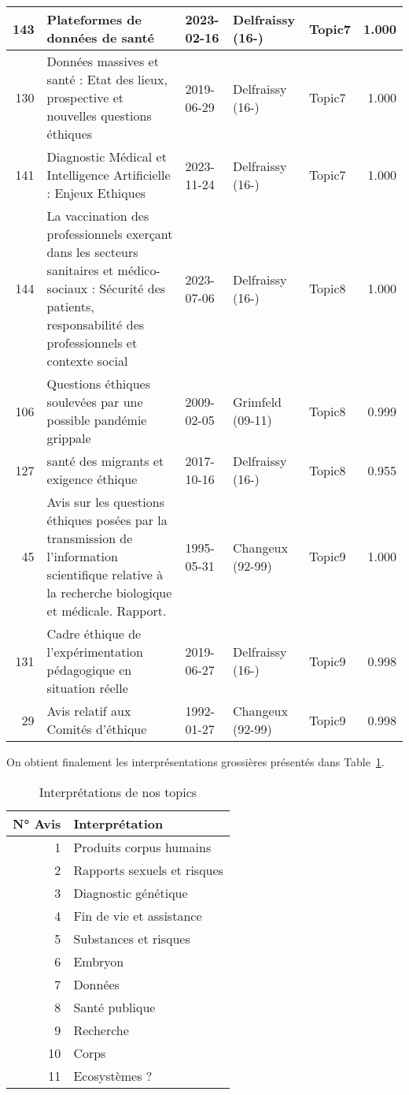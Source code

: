 \documentclass[
  letterpaper,
  DIV=11,
  numbers=noendperiod]{scrartcl}
\begin{document}
\begin{table}
\begin{tabular}{r|l|l|l|l|r}
\hline
143 & Plateformes de données de santé & 2023-02-16 & Delfraissy (16-) & Topic7 & 1.000\\
\hline
130 & Données massives et santé : Etat des lieux, prospective et nouvelles questions éthiques & 2019-06-29 & Delfraissy (16-) & Topic7 & 1.000\\
\hline
141 & Diagnostic Médical et Intelligence Artificielle : Enjeux Ethiques & 2023-11-24 & Delfraissy (16-) & Topic7 & 1.000\\
\hline
144 & La vaccination des professionnels exerçant dans les secteurs sanitaires et médico-sociaux : Sécurité des patients, responsabilité des professionnels et contexte social & 2023-07-06 & Delfraissy (16-) & Topic8 & 1.000\\
\hline
106 & Questions éthiques soulevées par une possible pandémie grippale & 2009-02-05 & Grimfeld (09-11) & Topic8 & 0.999\\
\hline
127 & santé des migrants et exigence éthique & 2017-10-16 & Delfraissy (16-) & Topic8 & 0.955\\
\hline
45 & Avis sur les questions éthiques posées par la transmission de l'information scientifique relative à la recherche biologique et médicale. Rapport. & 1995-05-31 & Changeux (92-99) & Topic9 & 1.000\\
\hline
131 & Cadre éthique de l’expérimentation pédagogique en situation réelle & 2019-06-27 & Delfraissy (16-) & Topic9 & 0.998\\
\hline
29 & Avis relatif aux Comités d'éthique & 1992-01-27 & Changeux (92-99) & Topic9 & 0.998\\
\hline
\end{tabular}
\end{table}

On obtient finalement les interprésentations grossières présentés dans
Table~\ref{tbl-stm-interpretations}.

\hypertarget{tbl-stm-interpretations}{}
\begin{table}
\caption{\label{tbl-stm-interpretations}Interprétations de nos topics }\tabularnewline

\centering
\begin{tabular}{r|l}
\hline
N° Avis & Interprétation\\
\hline
1 & Produits corpus humains\\
\hline
2 & Rapports sexuels et risques\\
\hline
3 & Diagnostic génétique\\
\hline
4 & Fin de vie et assistance\\
\hline
5 & Substances et risques\\
\hline
6 & Embryon\\
\hline
7 & Données\\
\hline
8 & Santé publique\\
\hline
9 & Recherche\\
\hline
10 & Corps\\
\hline
11 & Ecosystèmes ?\\
\hline
\end{tabular}
\end{table}
\end{document}
